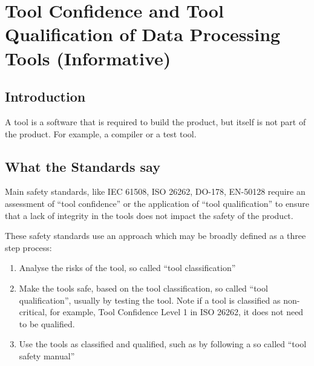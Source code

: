 %
\section{Tool Confidence and Tool Qualification of Data Processing Tools (Informative)}\label{bkm:tools}
%

\subsection{Introduction}
A tool is a software that is required to build the product, but itself is not part of the product. For example, a compiler or a test tool.

\subsection{What the Standards say}
Main safety standards, like IEC 61508, ISO 26262, DO-178, EN-50128 require an assessment of ``tool confidence''
or the application of ``tool qualification'' to ensure that a lack of integrity in the tools does not impact  the safety of the product. 

These safety standards use an approach which may be broadly defined as a three step process:

\begin{enumerate}
     \item Analyse the risks of the tool, so called ``tool classification''
     \item Make the tools safe, based on the tool classification, so called ``tool qualification'', usually by testing the tool.
       Note if a tool is classified as non-critical, for example, Tool Confidence Level 1 in ISO 26262, it does not need to be qualified.
     \item Use the tools as classified and qualified, such as by following a so called ``tool safety manual''
\end{enumerate}
 
